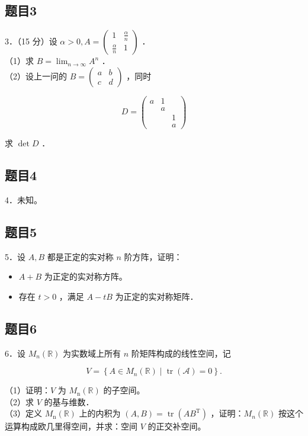 \documentclass{article}
\begin{document}
\subsection{题目3}
3．（15 分）设 \(\alpha>0, A=\left(\begin{array}{cc}1 & \frac{\alpha}{n} \\ \frac{\alpha}{n} & 1\end{array}\right)\) ．\\
（1）求 \(B=\lim _{n \rightarrow \infty} A^{n}\) ．\\
（2）设上一问的 \(B=\left(\begin{array}{ll}a & b \\ c & d\end{array}\right)\) ，同时

\[
D=\left(\begin{array}{lll}
a & 1 & \\
& a & \\
& & 1 \\
& & a
\end{array}\right)
\]

求 \(\operatorname{det} D\) ．

\subsection{题目4}
4．未知。

\subsection{题目5}
5．设 \(A, B\) 都是正定的实对称 \(n\) 阶方阵，证明：

\begin{itemize}
  \item[（1）] \(A+B\) 为正定的实对称方阵。
  \item[（2）] 存在 \(t>0\) ，满足 \(A-t B\) 为正定的实对称矩阵．
\end{itemize}

\subsection{题目6}
6．设 \(M_{n}(\mathbb{R})\) 为实数域上所有 \(n\) 阶矩阵构成的线性空间，记

\[
V=\left\{A \in M_{n}(\mathbb{R}) \mid \operatorname{tr}(\mathcal{A})=0\right\} .
\]

（1）证明：\(V\) 为 \(M_{\mathrm{n}}(\mathbb{R})\) 的子空间。\\
（2）求 \(V\) 的基与维数．\\
（3）定义 \(M_{\mathrm{n}}(\mathbb{R})\) 上的内积为 \((A, B)=\operatorname{tr}\left(A B^{\mathrm{T}}\right)\) ，证明：\(M_{n}(\mathbb{R})\) 按这个运算构成欧几里得空间，并求：空间 \(V\) 的正交补空间。
\end{document}

